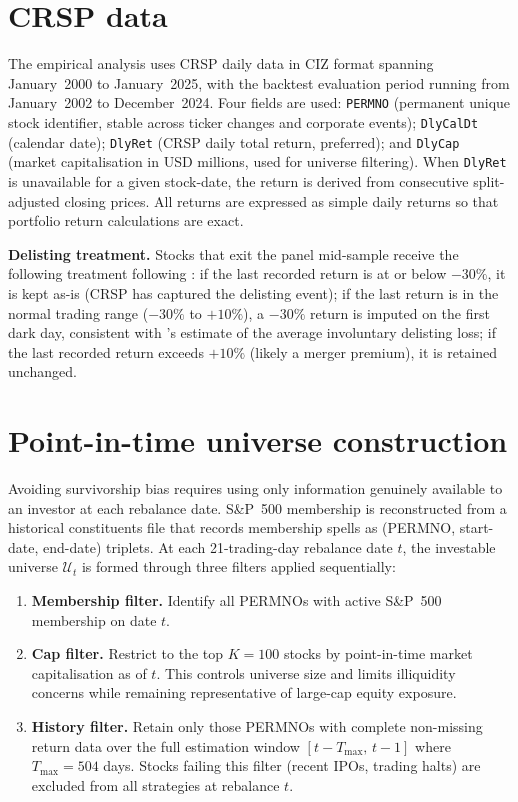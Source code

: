 \documentclass[a4paper,12pt]{report}
\begin{document}
\section{CRSP data}
\label{sec:data-crsp}

The empirical analysis uses CRSP daily data in CIZ format spanning January~2000
to January~2025, with the backtest evaluation period running from January~2002
to December~2024. Four fields are used: \texttt{PERMNO} (permanent unique stock
identifier, stable across ticker changes and corporate events);
\texttt{DlyCalDt} (calendar date); \texttt{DlyRet} (CRSP daily total return,
preferred); and \texttt{DlyCap} (market capitalisation in USD millions, used
for universe filtering). When \texttt{DlyRet} is unavailable for a given
stock-date, the return is derived from consecutive split-adjusted closing
prices. All returns are expressed as simple daily returns so that portfolio
return calculations are exact.

\textbf{Delisting treatment.} Stocks that exit the panel mid-sample receive
the following treatment following \citet{shumway1997}: if the last recorded
return is at or below $-30\%$, it is kept as-is (CRSP has captured the
delisting event); if the last return is in the normal trading range
($-30\%$ to $+10\%$), a $-30\%$ return is imputed on the first dark day,
consistent with \citeauthor{shumway1997}'s estimate of the average
involuntary delisting loss; if the last recorded return exceeds $+10\%$
(likely a merger premium), it is retained unchanged.

\section{Point-in-time universe construction}
\label{sec:data-pit}

Avoiding survivorship bias requires using only information genuinely
available to an investor at each rebalance date. S\&P~500 membership is
reconstructed from a historical constituents file that records membership
spells as (PERMNO, start-date, end-date) triplets. At each 21-trading-day
rebalance date $t$, the investable universe $\mathcal{U}_t$ is formed through
three filters applied sequentially:

\begin{enumerate}
  \item \textbf{Membership filter.} Identify all PERMNOs with active
        S\&P~500 membership on date $t$.
  \item \textbf{Cap filter.} Restrict to the top $K = 100$ stocks by
        point-in-time market capitalisation as of $t$. This controls
        universe size and limits illiquidity concerns while remaining
        representative of large-cap equity exposure.
  \item \textbf{History filter.} Retain only those PERMNOs with complete
        non-missing return data over the full estimation window
        $[t - T_{\max},\, t-1]$ where $T_{\max} = 504$ days. Stocks
        failing this filter (recent IPOs, trading halts) are excluded
        from all strategies at rebalance $t$.
\end{enumerate}
\end{document}
